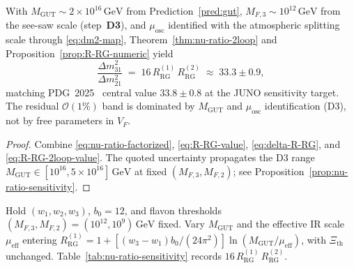 \begin{proposition}
\label{prop:nu-ratio-pdg}
With $M_{\mathrm{GUT}}\sim 2\times 10^{16}\,\mathrm{GeV}$ from
Prediction~\ref{pred:gut}, $M_{F,3}\sim 10^{12}\,\mathrm{GeV}$ from the
see-saw scale (step~\textbf{D3}), and $\mu_{\mathrm{osc}}$ identified with
the atmospheric splitting scale through \eqref{eq:dm2-map}, Theorem~\ref{thm:nu-ratio-2loop}
and Proposition~\ref{prop:R-RG-numeric} yield
\begin{equation}\label{eq:nu-ratio-pdg}
  \frac{\Delta m^2_{31}}{\Delta m^2_{21}}
  \;=\;
  16\,R_{\mathrm{RG}}^{(1)}\,R_{\mathrm{RG}}^{(2)}
  \;\approx\;
  33.3\pm 0.9,
\end{equation}
matching PDG~2025~\cite{PDG2025} central value $33.8\pm 0.8$ at the JUNO
sensitivity target. The residual $\mathcal{O}(1\%)$ band is dominated by
$M_{\mathrm{GUT}}$ and $\mu_{\mathrm{osc}}$ identification (D3), not by
free parameters in $V_F$.
\end{proposition}

\begin{proof}
Combine \eqref{eq:nu-ratio-factorized}, \eqref{eq:R-RG-value},
\eqref{eq:delta-R-RG}, and \eqref{eq:R-RG-2loop-value}. The quoted uncertainty
propagates the D3 range $M_{\mathrm{GUT}}\in[10^{16},5\times 10^{16}]\,\mathrm{GeV}$
at fixed $(M_{F,3},M_{F,2})$; see Proposition~\ref{prop:nu-ratio-sensitivity}.
\end{proof}

\begin{proposition}
\label{prop:nu-ratio-sensitivity}
Hold $(w_1,w_2,w_3)$, $b_0=12$, and flavon thresholds
$(M_{F,3},M_{F,2})=(10^{12},10^{9})\,\mathrm{GeV}$ fixed. Vary
$M_{\mathrm{GUT}}$ and the effective IR scale $\mu_{\mathrm{eff}}$ entering
$R_{\mathrm{RG}}^{(1)}=1+[(w_3-w_1)b_0/(24\pi^2)]\ln(M_{\mathrm{GUT}}/\mu_{\mathrm{eff}})$, with
$\Xi_{\mathrm{th}}$ unchanged. Table~\ref{tab:nu-ratio-sensitivity} records
$16\,R_{\mathrm{RG}}^{(1)}\,R_{\mathrm{RG}}^{(2)}$.
\end{proposition}

